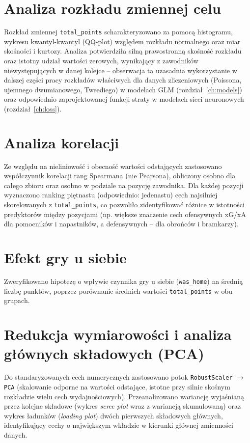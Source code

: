 \documentclass[a4paper,twoside,11pt]{mwrep}
\theoremstyle{plain} \newtheorem{thm}{Twierdzenie}
\theoremstyle{plain} \newtheorem{lem}{Lemat}
\theoremstyle{definition} \newtheorem{defn}{Definicja}
\theoremstyle{remark} \newtheorem*{rem}{Wniosek}
\begin{document}
\section{Analiza rozkładu zmiennej celu}

Rozkład zmiennej \texttt{total\_points} scharakteryzowano za pomocą
histogramu, wykresu kwantyl-kwantyl (QQ-plot) względem rozkładu
normalnego oraz miar skośności i kurtozy. Analiza potwierdziła silną
prawostronną skośność rozkładu oraz istotny udział wartości zerowych,
wynikający z zawodników niewystępujących w danej kolejce -- obserwacja ta
uzasadnia wykorzystanie w dalszej części pracy rozkładów właściwych dla
danych zliczeniowych (Poissona, ujemnego dwumianowego, Tweediego) w
modelach GLM (rozdział~\ref{ch:models}) oraz odpowiednio zaprojektowanej
funkcji straty w modelach sieci neuronowych (rozdział~\ref{ch:loss}).

\section{Analiza korelacji}

Ze względu na nieliniowość i obecność wartości odstających zastosowano
współczynnik korelacji rang Spearmana (nie Pearsona), obliczony osobno dla
całego zbioru oraz osobno w podziale na pozycję zawodnika. Dla każdej
pozycji wyznaczono ranking piętnastu (odpowiednio: jedenastu) cech
najsilniej skorelowanych z \texttt{total\_points}, co pozwoliło
zidentyfikować różnice w istotności predyktorów między pozycjami (np.
większe znaczenie cech ofensywnych xG/xA dla pomocników i napastników,
a defensywnych -- dla obrońców i bramkarzy).

\section{Efekt gry u siebie}

Zweryfikowano hipotezę o wpływie czynnika gry u siebie (\texttt{was\_home})
na średnią liczbę punktów, poprzez porównanie średnich wartości
\texttt{total\_points} w obu grupach.

\section{Redukcja wymiarowości i analiza głównych składowych (PCA)}

Do standaryzowanych cech numerycznych zastosowano potok
\texttt{RobustScaler} $\rightarrow$ \texttt{PCA} (skalowanie odporne na
wartości odstające, istotne przy silnie skośnym rozkładzie wielu cech
wydajnościowych). Przeanalizowano wariancję wyjaśnianą przez kolejne
składowe (wykres \emph{scree plot} wraz z wariancją skumulowaną) oraz
wykres ładunków (\emph{loading plot}) dwóch pierwszych składowych głównych,
identyfikujący cechy o największym wkładzie w kierunki głównej zmienności
danych.
\end{document}
